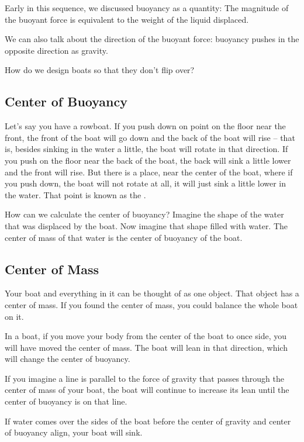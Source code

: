 Early in this sequence, we discussed buoyancy as a quantity: The magnitude of the buoyant force is equivalent to the weight of the liquid displaced.

We can also talk about the direction of the buoyant force: buoyancy pushes in the opposite direction as gravity.

How do we design boats so that they don't flip over?

\subsection{Center of Buoyancy}

Let's say you have a rowboat.   If you push down on point on the floor near the front,  the front of the boat will go down and the back of the boat will rise -- 
that is, besides sinking in the water a little,  the boat will rotate in that direction.   If you push on the floor near the back of the boat,  the back will sink a little lower and the front will rise.  But there is a place, near the center of the boat, where if you push down,  the boat will not rotate at all,  it will just sink a little lower
in the water.    That point is known as the .


How can we calculate the center of buoyancy?  Imagine the shape of the water that was displaced by the boat.   Now imagine that shape filled with water.   The center of mass of that water is the center of buoyancy of the boat.

\subsection{Center of Mass}

Your boat and everything in it can be thought of as one object.  That object has a center of mass.    If you found the center of mass,  you could balance the whole boat on it.

In a boat,  if you move your body from the center of the boat to once side,   you will have moved the center of mass.    The boat will lean in that direction,   which will change the center of buoyancy. 

If you imagine a line is parallel to the force of gravity that passes through the center of mass of your boat,   the boat will continue to increase its lean until
the center of buoyancy is on that line.  

If water comes over the sides of the boat before the center of gravity and center of buoyancy align,  your boat will sink.

